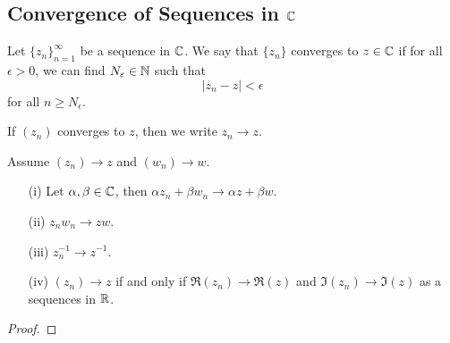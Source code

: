 \documentclass[a4paper]{report}
\begin{document}
\subsection{Convergence of Sequences in \( \C \)}

\begin{definition}[Convergence in \( \C  \)]
    Let \( {\{ {z}_{n} \} }_{n=1}^{\infty }     \) be a sequence in \( \C  \). We say that \( \{ {z}_{n} \}   \) converges to \( z \in \mathbb{C}  \) if for all \(  \epsilon > 0  \), we can find \( {N}_{\varepsilon} \in \mathbb{N}  \) such that  
    \[  | {z}_{n} - z  |  < \epsilon \]
    for all \( n \geq {N}_{\epsilon} \).
\end{definition}

If \( ({z}_{n}) \) converges to \( z  \), then we write \( {z}_{n} \to z  \).

\begin{prop}
   Assume \( ({z}_{n}) \to z  \) and \( ({w}_{n}) \to w   \). 
   \begin{enumerate}
       \item[(i)] Let \( \alpha, \beta \in \mathbb{C}  \), then \( \alpha {z}_{n} + \beta {w}_{n} \to \alpha z + \beta w  \).
        \item[(ii)] \( {z}_{n} {w}_{n} \to zw  \).
        \item[(iii)] \( {z}_{n}^{-1} \to z^{-1} \).
        \item[(iv)] \( ({z}_{n}) \to z  \) if and only if \( \Re({z}_{n}) \to \Re(z) \) and \( \Im({z}_{n}) \to \Im(z) \) as a sequences in \( \mathbb{R}  \).
   \end{enumerate}
\end{prop}
\begin{proof}

\end{proof}
\end{document}

